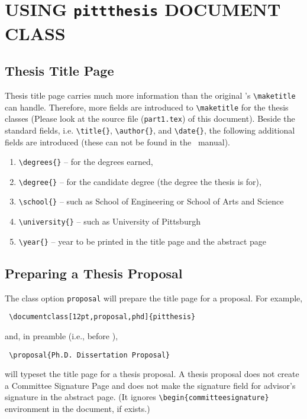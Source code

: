 \chapter{USING \texttt{pittthesis} DOCUMENT CLASS}

\section{Thesis Title Page}
Thesis title page carries much more information than the original \LaTeXe 's
\verb|\maketitle| can handle.  Therefore, more fields are introduced to
\verb|\maketitle| for the thesis classes (Please look at the source file
(\texttt{part1.tex}) of this document).  Beside the standard fields, i.e.
\verb|\title{}|, \verb|\author{}|, and \verb|\date{}|, the following additional
fields are introduced (these can not be found in the \LaTeXe\ manual).
\begin{enumerate}
    \item \verb|\degrees{}| -- for the degrees earned,
    \item \verb|\degree{}| -- for the candidate degree (the degree the thesis is
	    for),
    \item \verb|\school{}| -- such as School of Engineering or
	    School of Arts and Science
    \item \verb|\university{}| -- such as University of Pittsburgh
    \item \verb|\year{}| -- year to be printed in the title page
			  and the abstract page
\end{enumerate}

\section{Preparing a Thesis Proposal}

The class option \texttt{proposal} will prepare the title page for a proposal.
For example,
\begin{verbatim}
 \documentclass[12pt,proposal,phd]{pitthesis}
\end{verbatim}
and, in preamble (i.e., before \verb||),
\begin{verbatim}
 \proposal{Ph.D. Dissertation Proposal}
\end{verbatim}
will typeset the title page for a thesis proposal.
A thesis proposal does not create a Committee Signature Page and does not
make the signature field for advisor's signature in the abstract page.
(It ignores \verb|\begin{committeesignature}| environment in the document, if
exists.)


